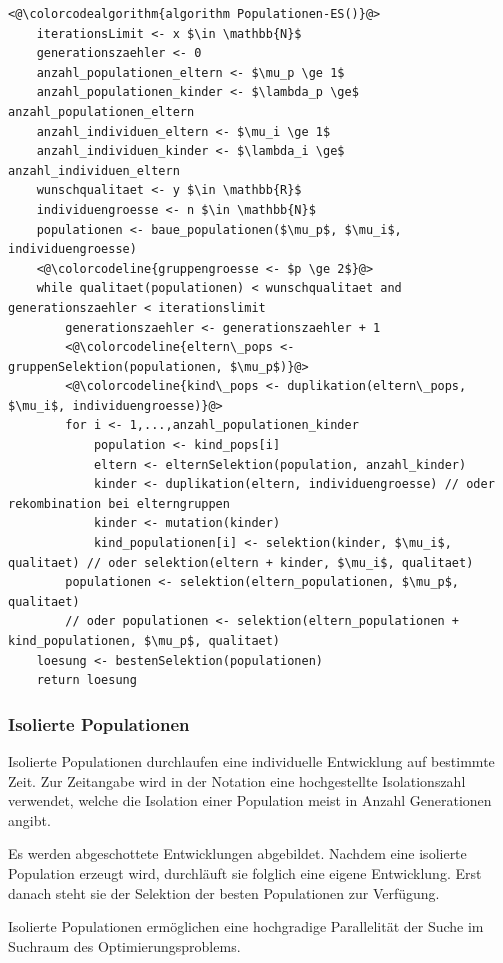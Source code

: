 \begin{lstlisting}[caption={Evolutionsstrategien mit mehreren Populationen und Individuentausch}, firstnumber=1, captionpos=b, label=code:populationen_ind_vertauschen_es]
<@\colorcodealgorithm{algorithm Populationen-ES()}@>
	iterationsLimit <- x $\in \mathbb{N}$
	generationszaehler <- 0
	anzahl_populationen_eltern <- $\mu_p \ge 1$
	anzahl_populationen_kinder <- $\lambda_p \ge$ anzahl_populationen_eltern
	anzahl_individuen_eltern <- $\mu_i \ge 1$
	anzahl_individuen_kinder <- $\lambda_i \ge$ anzahl_individuen_eltern
	wunschqualitaet <- y $\in \mathbb{R}$
	individuengroesse <- n $\in \mathbb{N}$
	populationen <- baue_populationen($\mu_p$, $\mu_i$, individuengroesse)
	<@\colorcodeline{gruppengroesse <- $p \ge 2$}@>
	while qualitaet(populationen) < wunschqualitaet and generationszaehler < iterationslimit
		generationszaehler <- generationszaehler + 1
		<@\colorcodeline{eltern\_pops <- gruppenSelektion(populationen, $\mu_p$)}@>
		<@\colorcodeline{kind\_pops <- duplikation(eltern\_pops, $\mu_i$, individuengroesse)}@>
		for i <- 1,...,anzahl_populationen_kinder
			population <- kind_pops[i]
			eltern <- elternSelektion(population, anzahl_kinder)
			kinder <- duplikation(eltern, individuengroesse) // oder rekombination bei elterngruppen
			kinder <- mutation(kinder)
			kind_populationen[i] <- selektion(kinder, $\mu_i$, qualitaet) // oder selektion(eltern + kinder, $\mu_i$, qualitaet)
		populationen <- selektion(eltern_populationen, $\mu_p$, qualitaet)
		// oder populationen <- selektion(eltern_populationen + kind_populationen, $\mu_p$, qualitaet)
	loesung <- bestenSelektion(populationen)
	return loesung
\end{lstlisting}

\subsubsection{Isolierte Populationen}

Isolierte Populationen durchlaufen eine individuelle Entwicklung auf bestimmte Zeit.
Zur Zeitangabe wird in der Notation eine hochgestellte Isolationszahl verwendet, welche die Isolation einer Population meist in Anzahl Generationen angibt.

Es werden abgeschottete Entwicklungen abgebildet.
Nachdem eine isolierte Population erzeugt wird, durchläuft sie folglich eine eigene Entwicklung.
Erst danach steht sie der Selektion der besten Populationen zur Verfügung.

Isolierte Populationen ermöglichen eine hochgradige Parallelität der Suche im Suchraum des Optimierungsproblems.

